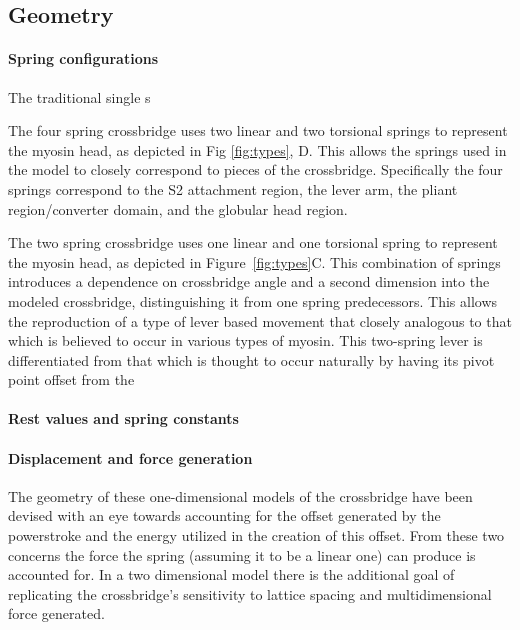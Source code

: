\documentclass[]{article}
\begin{document}
\subsection*{Geometry} %

\paragraph{Spring configurations} %
The traditional single s

The four spring crossbridge uses two linear and two torsional springs to represent the myosin head, as depicted in Fig \ref{fig:types}, D. 
This allows the springs used in the model to closely correspond to pieces of the crossbridge. 
Specifically the four springs correspond to the S2 attachment region, the lever arm, the pliant region/converter domain, and the globular head region.

The two spring crossbridge uses one linear and one torsional spring to represent the myosin head, as depicted in Figure~\ref{fig:types}C.
This combination of springs introduces a dependence on crossbridge angle and a second dimension into the modeled crossbridge, distinguishing it from one spring predecessors.
This allows the reproduction of a type of lever based movement that closely analogous to that which is believed to occur in various types of myosin.
This two-spring lever is differentiated from that which is thought to occur naturally by having its pivot point offset from the 


\paragraph{Rest values and spring constants} %

\paragraph{Displacement and force generation} %
The geometry of these one-dimensional models of the crossbridge have been devised with an eye towards accounting for the offset generated by the powerstroke and the energy utilized in the creation of this offset. 
From these two concerns the force the spring (assuming it to be a linear one) can produce is accounted for. 
In a two dimensional model there is the additional goal of replicating the crossbridge's sensitivity to lattice spacing and multidimensional force generated. 
\end{document}
